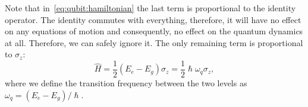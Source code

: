 \documentclass[fontsize=9pt,bookmarkpackage=false]{scrartcl}
\renewcommand{\hbar}{\hslash}
\begin{document}
Note that in~\cref{eq:qubit:hamiltonian} the last term is proportional to the identity operator.
The identity commutes with everything, therefore, it will have no effect on any equations of motion and consequently, no effect on the quantum dynamics at all.
Therefore, we can safely ignore it.
The only remaining term is proportional to $\sigma_z$:
\begin{equation}
  \hat H = \frac 12 ( E_e - E_g ) \sigma_z = \frac 12 \hbar \omega_q \sigma_z,
\end{equation}
where we define  the transition frequency between the two levels as $\omega_q = ( E_e - E_g ) / \hbar$.


% 
\end{document}
